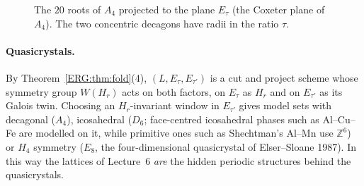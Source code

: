 \documentclass[11pt,openany]{book}
\theoremstyle{plain}
\theoremstyle{definition}
\theoremstyle{remark}
\newcommand{\Z}{\mathbb{Z}}
\begin{document}
\begin{figure}[ht]
\centering
{}
\caption{The $20$ roots of $A_4$ projected to the plane $E_\tau$ (the Coxeter plane of $A_4$). The two
concentric decagons have radii in the ratio $\tau$.}
\label{ERG:fig:a4}
\end{figure}

\paragraph{Quasicrystals.} By Theorem~\ref{ERG:thm:fold}(4), $(L,E_\tau,E_{\tau'})$ is a cut and project
scheme whose symmetry group $W(H_r)$ acts on both factors, on $E_\tau$ as $H_r$ and on $E_{\tau'}$ as its
Galois twin. Choosing an $H_r$-invariant window in $E_{\tau'}$ gives model sets with decagonal ($A_4$),
icosahedral ($D_6$; face-centred icosahedral phases such as Al--Cu--Fe are modelled on it, while
primitive ones such as Shechtman's Al--Mn use $\Z^6$) or $H_4$ symmetry ($E_8$, the
four-dimensional quasicrystal of Elser--Sloane 1987). In this way the lattices of Lecture~6 \emph{are}
the hidden periodic structures behind the quasicrystals.
\end{document}
